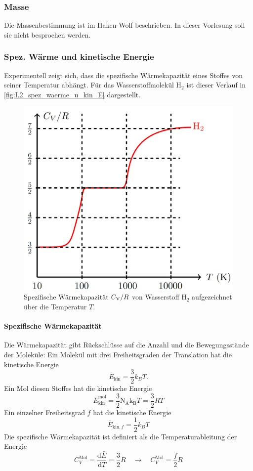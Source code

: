     \subsubsection{Masse}
        \begin{verbal}
            Die Massenbestimmung ist im Haken-Wolf beschrieben. In dieser Vorlesung soll sie nicht besprochen werden.
        \end{verbal}
    
\subsubsection{Spez. Wärme und kinetische Energie}
    Experimentell zeigt sich, dass die spezifische Wärmekapazität eines Stoffes von seiner Temperatur abhängt. Für das Wasserstoffmolekül H${}_2$ ist dieser Verlauf in \autoref{fig:I.2_spez_waerme_u_kin_E} dargestellt.
    \begin{figure}[H]
        \centering
        \includegraphics[width=0.6\linewidth]{figures/vl01/spez_waerme_u_kin_E.png}
        \caption{Spezifische Wärmekapazität $C_\text V/R$ von Wasserstoff H${}_2$ aufgezeichnet über die Temperatur $T$.}
        \label{fig:I.2_spez_waerme_u_kin_E}
    \end{figure}
\paragraph{Spezifische Wärmekapazität}
    Die Wärmekapazität gibt Rückschlüsse auf die Anzahl und die Bewegungsstände der Moleküle:
    Ein Molekül mit drei Freiheitsgraden der Translation hat die kinetische Energie
    $$
    \bar{E}_{\text{kin}} = \frac{3}{2} k_{B}T.
    $$
    Ein Mol diesen Stoffes hat die kinetische Energie
    $$\bar{E}_{\text{kin}}^{\text{mol}} =\frac{3}{2} \mathrm{N}_{\mathrm{A}}\mathrm{k}_\mathrm{B} T = \frac{3}{2} RT
    $$
    Ein einzelner Freiheitsgrad $f$ hat die kinetische Energie
    $$
    \bar{E}_{\text{kin}, f} = \frac{1}{2} k_{B}T
    $$
    Die spezifische Wärmekapazität ist definiert als die Temperaturableitung der Energie
    $$
    C_{V}^{\text{Mol}} = \frac{\text{d}\bar{E}}{\text{d}T} = \frac{3}{2} R \quad \to \quad  C_{V}^{\text{Mol}} = \frac{f}{2} R
    $$

